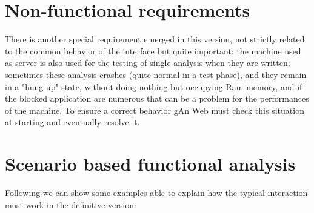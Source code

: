 \section{Non-functional requirements}

There is another special requirement emerged in this version, not strictly related to the common behavior of the interface but quite important: the machine  used as server is also used for the testing of single analysis when they are written; sometimes these analysis crashes (quite normal in a test phase), and they remain in a "hung up" state, without doing nothing but occupying Ram memory, and if the blocked application are numerous that can be a problem for the performances of the machine. To ensure a correct behavior gAn Web must check this situation at starting and eventually resolve it.

\section{Scenario based functional analysis}
Following we can show some examples able to explain how the typical interaction must work in the definitive version:

